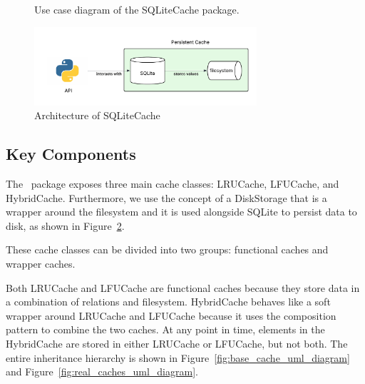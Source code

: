 \documentclass[11pt, journal]{IEEEtran}
\begin{document}
\begin{figure}
    \caption{Use case diagram of the SQLiteCache package.}
    \label{fig:use_case_diagram}
\end{figure}

\begin{figure}[ht]
    \centering
    \includegraphics[width=3.25in]{images/overall_architecture.png}
    \caption{Architecture of SQLiteCache}
    \label{fig:architecture}
\end{figure}

\subsection{Key Components}
The \sqlitecache~package exposes three main cache classes: LRUCache, LFUCache, and HybridCache.
Furthermore, we use the concept of a DiskStorage that is a wrapper around the filesystem
and it is used alongside SQLite to persist data to disk, as shown in Figure~\ref{fig:architecture}.

These cache classes can be divided into two groups: functional caches and wrapper caches.

Both LRUCache and LFUCache are functional caches because they store data
in a combination of relations and filesystem.
HybridCache behaves like a soft wrapper around LRUCache and LFUCache because
it uses the composition pattern to combine the two caches. At any point in time,
elements in the HybridCache are stored in either LRUCache or LFUCache, but not both.
The entire inheritance hierarchy is shown in Figure~\ref{fig:base_cache_uml_diagram}
and Figure~\ref{fig:real_caches_uml_diagram}.
\end{document}
